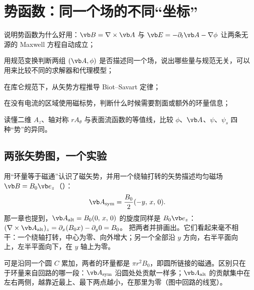 \chapter{势函数：同一个场的不同“坐标”}\label{ch:potentials}

\begin{chapterguide}
\begin{guidegoals}
\item 说明势函数为什么好用：$\vb B=\nabla\times\vb A$ 与 $\vb E=-\partial_t\vb A-\nabla\phi$ 让两条无源的 Maxwell 方程自动成立；
\item 用规范变换判断两组 $(\vb A,\phi)$ 是否描述同一个场，说出哪些量与规范无关，可以用来比较不同的求解器和代理模型；
\item 在库仑规范下，从矢势方程推导 Biot–Savart 定律；
\item 在没有电流的区域使用磁标势，判断什么时候需要割面或额外的环量信息；
\item 读懂二维 $A_z$、轴对称 $rA_\theta$ 与表面流函数的等值线，比较 $\phi$、$\vb A$、$\psi$、$\psi_s$ 四种“势”的异同。
\end{guidegoals}
\end{chapterguide}

\section{两张矢势图，一个实验}\label{sec:potentials-puzzle}

 用“环量等于磁通”认识了磁矢势，并用一个绕轴打转的矢势描述均匀磁场 $\vb B=B_0\vb e_z$（）：
\begin{equation}
\vb A_{\rm sym}=\frac{B_0}{2}(-y,\,x,\,0).
\end{equation}
那一章也提到，$\vb A_{\rm alt}=B_0(0,\,x,\,0)$ 的旋度同样是 $B_0\vb e_z$：$(\nabla\times\vb A_{\rm alt})_z=\partial_x(B_0x)-\partial_y0=B_0$。 把两者并排画出。它们看起来毫不相干：一个绕轴打转，中心为零、向外增大；另一个全部沿 $y$ 方向，右半平面向上，左半平面向下，在 $y$ 轴上为零。

可是沿同一个圆 $C$ 累加，两者的环量都是 $\pi r^2B_0$，即圆所链接的磁通。区别只在于环量来自回路的哪一段：$\vb A_{\rm sym}$ 沿圆处处贡献一样多；$\vb A_{\rm alt}$ 的贡献集中在左右两侧，越靠近最上、最下两点越小，在那里为零（图中回路的线宽）。

